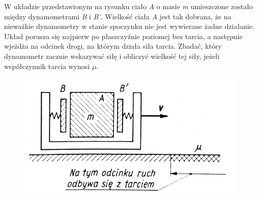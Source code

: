 W układzie przedstawionym na rysunku ciało \emph{A} o masie \emph{m} umieszczone zostało między dynamometrami \emph{B} i \emph{B'}. Wielkość ciała \emph{A} jest tak dobrana, że na nieważkie dynamometry w stanie spoczynku nie jest wywierane żadne działanie. Układ porusza się najpierw po płaszczyźnie poziomej bez tarcia, a następnie wjeżdża na odcinek drogi, na którym działa siła tarcia. Zbadać, który dynamometr zacznie wskazywać siłę i obliczyć wielkość tej siły, jeżeli współczynnik tarcia wynosi $\mu$.
\begin{figure}[H]
	\centering
	\includegraphics[width=0.4\linewidth]{../rysunki/dynamika/dwa-dynamometry}
\end{figure}

